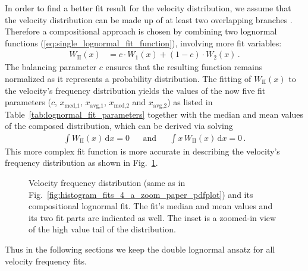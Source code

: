 In order to find a better fit result for the velocity distribution, we assume that the velocity distribution can be made up of at least two overlapping branches \citep{McGregor2011b}. Therefore a compositional approach  is chosen by combining two lognormal functions (\ref{eq:single_lognormal_fit_function}), involving more fit variables:
\begin{align}
	W_\text{II}(x) &= c \cdot W_1(x) + (1 -c) \cdot W_2(x)\,.	\label{eq:double_lognormal_fit_function}
\end{align}
The balancing parameter $c$ ensures that the resulting function remains normalized as it represents a probability distribution.
The fitting of $W_\text{II}(x)$ to the velocity's frequency distribution yields the values of the now five fit parameters ($c$, $x_\text{med,1}$, $x_\text{avg,1}$, $x_\text{med,2}$ and $x_\text{avg,2}$) as listed in Table~\ref{tab:lognormal_fit_parameters} together with the median and mean values of the composed distribution, which can be derived via solving
\begin{align}
	\int W_\text{II}(x)\,\text{d}x = 0	&	&\text{and}	&	&\int x\,W_\text{II}(x)\,\text{d}x = 0	\,.
\end{align}
This more complex fit function is more accurate in describing the velocity's frequency distribution as shown in Fig.~\ref{fig:histogram_fits_V_a_zoom_dbl_paper_pdfplot}.
\begin{figure}
	\caption{Velocity frequency distribution (same as in Fig.~\ref{fig:histogram_fits_4_a_zoom_paper_pdfplot}) and its compositional lognormal fit. The fit's median and mean values and its two fit parts are indicated as well. The inset is a zoomed-in view of the high value tail of the distribution.}
	\label{fig:histogram_fits_V_a_zoom_dbl_paper_pdfplot}
\end{figure}
Thus in the following sections we keep the double lognormal ansatz for all velocity frequency fits.

